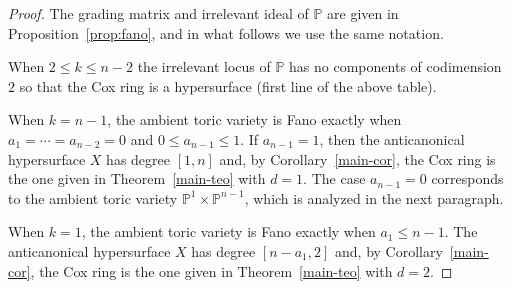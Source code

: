 \documentclass{amsart}
\theoremstyle{definition}
\theoremstyle{remark}
\begin{document}
\begin{proof}
The grading matrix and irrelevant ideal of
$\mathbb P$ are given in Proposition~\ref{prop:fano},
and in what follows we use the same notation.

When $2\leq k\leq n-2$ the irrelevant locus of
$\mathbb P$ has no components of codimension $2$
so that the Cox ring is a hypersurface (first line
of the above table).

When $k = n-1$, the ambient toric variety is Fano
exactly when $a_1=\cdots=a_{n-2}=0$ and
$0\leq a_{n-1}\leq 1$. If $a_{n-1} = 1$,
then the anticanonical hypersurface $X$
has degree $[1,n]$ and, by Corollary~\ref{main-cor},
the Cox ring is the one given in Theorem~\ref{main-teo}
with $d = 1$.
The case $a_{n-1} = 0$ corresponds to
the ambient toric variety $\mathbb P^1
\times\mathbb P^{n-1}$, which is analyzed
in the next paragraph.

When $k=1$, the ambient toric variety is Fano
exactly when $a_1 \leq n-1$.
The anticanonical hypersurface $X$ has degree
$[n-a_1,2]$ and, by Corollary~\ref{main-cor},
the Cox ring is the one given in Theorem~\ref{main-teo}
with $d = 2$.

\end{proof}
\end{document}
